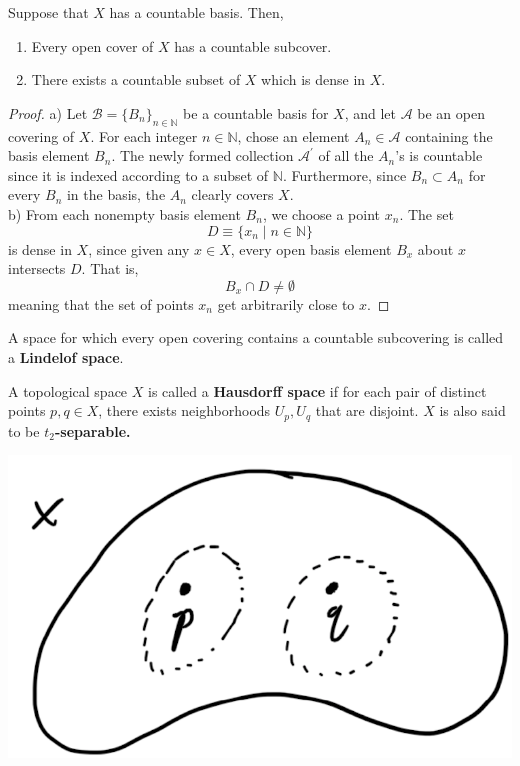 \documentclass{article}
\begin{document}
    \begin{theorem}
    Suppose that $X$ has a countable basis. Then, 
    \begin{enumerate}
        \item Every open cover of $X$ has a countable subcover. 
        \item There exists a countable subset of $X$ which is dense in $X$. 
    \end{enumerate}
    \end{theorem}
    \begin{proof}
    a) Let $\mathscr{B} = \{B_n\}_{n \in \mathbb{N}}$ be a countable basis for $X$, and let $\mathscr{A}$ be an open covering of $X$. For each integer $n \in \mathbb{N}$, chose an element $A_n \in \mathscr{A}$ containing the basis element $B_n$. The newly formed collection $\mathscr{A}^\prime$ of all the $A_n$'s is countable since it is indexed according to a subset of $\mathbb{N}$. Furthermore, since $B_n \subset A_n$ for every $B_n$ in the basis, the $A_n$ clearly covers $X$. \\
    b) From each nonempty basis element $B_n$, we choose a point $x_n$. The set 
    \[D \equiv \{x_n \; | \; n \in \mathbb{N}\}\]
    is dense in $X$, since given any $x \in X$, every open basis element $B_x$ about $x$ intersects $D$. That is, 
    \[B_x \cap D \neq \emptyset\]
    meaning that the set of points $x_n$ get arbitrarily close to $x$. 
    \end{proof}

    \begin{definition}
    A space for which every open covering contains a countable subcovering is called a \textbf{Lindelof space}. 
    \end{definition}

    \begin{definition}
    A topological space $X$ is called a \textbf{Hausdorff space} if for each pair of distinct points $p, q \in X$, there exists neighborhoods $U_p, U_q$ that are disjoint. $X$ is also said to be \textbf{$t_2$-separable.}
    \begin{center}
        \includegraphics[scale=0.35]{img/Hausdorff_Space_Separability.PNG}
    \end{center}
    \end{definition}
\end{document}
